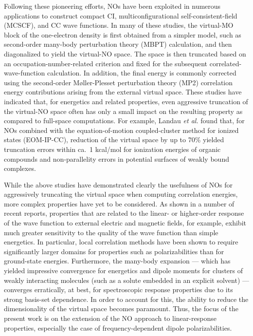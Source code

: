 \documentclass[journal=jpccck,manuscript=article]{achemso}
\begin{document}
Following these pioneering efforts, NOs have been exploited in numerous
applications to construct compact CI,\cite{Fermann94,Sherrill98:CI,Abrams04}
multiconfigurational self-consistent-field (MCSCF),\cite{Jensen88} and CC wave
functions.\cite{Sosa89,Taube05,Taube08,Landau10,DePrince13:FNOs,DePrince13} In
many of these studies, the virtual-MO block of the one-electron density is
first obtained from a simpler model, such as second-order many-body
perturbation theory (MBPT) calculation, and then diagonalized to yield the
virtual-NO space.  The space is then truncated based on an
occupation-number-related criterion and fixed for the subsequent
correlated-wave-function calculation.  In addition, the final energy is
commonly corrected using the second-order M\o ller-Plesset perturbation theory
(MP2) correlation energy contributions arising from the external virtual
space.  These studies have indicated that, for energetics and related
properties, even aggressive truncation of the virtual-NO space often has only
a small impact on the resulting property as compared to full-space
computations.  For example, Landau {\em et al.}\cite{Landau10} found that,
for NOs
combined with the equation-of-motion coupled-cluster method for ionized states
(EOM-IP-CC), reduction of the virtual space by up to 70\% yielded truncation
errors within ca.\ 1 kcal/mol for ionization energies of organic compounds and
non-parallelity errors in potential surfaces of weakly bound complexes.

While the above studies have demonstrated clearly the usefulness of NOs for
aggressively truncating the virtual space when computing correlation energies,
more complex properties have yet to be considered.  As shown in a number of
recent
reports,\cite{Korona04,Russ04,Russ08,McAlexander12,Friedrich15,McAlexander15:LRCC}
properties that are related to the linear- or higher-order response of the
wave function to external electric and magnetic fields, for example, exhibit
much greater sensitivity to the quality of the wave function than simple
energetics.  In particular, local correlation methods have been
shown\cite{Korona04,Russ04,Russ08,McAlexander12,McAlexander15:LRCC} to
require significantly larger domains for properties such as polarizabilities
than for ground-state energies.  Furthermore, the many-body expansion ---
which has yielded impressive convergence for energetics and dipole moments for
clusters of weakly interacting molecules (such as a solute embedded in an
explicit solvent) --- converges erratically, at best, for spectroscopic
response properties due to its strong basis-set dependence.\cite{Mach14}
In order to account for this, the ability to reduce the dimensionality
of the virtual space becomes paramount.  Thus, the focus of the present
work is on the extension of the NO approach to linear-response
properties, especially the case of frequency-dependent dipole
polarizabilities.
\end{document}
